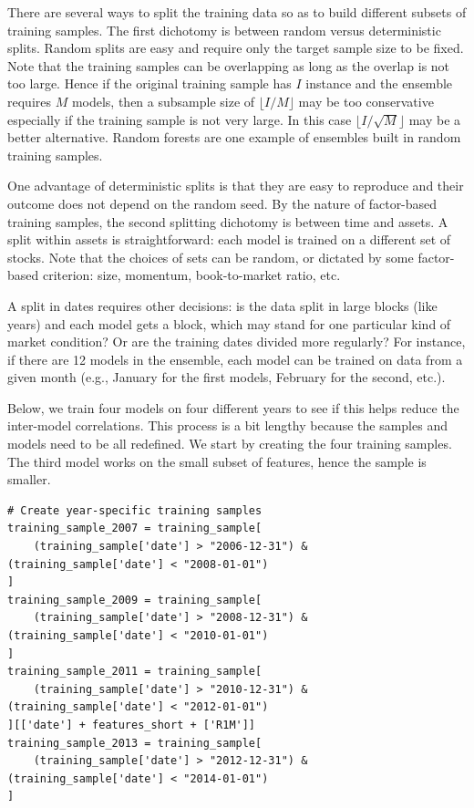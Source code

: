 There are several ways to split the training data so as to build different subsets of training samples. The first dichotomy is between random versus deterministic splits. Random splits are easy and require only the target sample size to be fixed. Note that the training samples can be overlapping as long as the overlap is not too large. Hence if the original training sample has $I$ instance and the ensemble requires $M$ models, then a subsample size of $\lfloor I/M \rfloor$ may be too conservative especially if the training sample is not very large. In this case $\lfloor I/\sqrt{M} \rfloor$ may be a better alternative. Random forests are one example of ensembles built in random training samples.

One advantage of deterministic splits is that they are easy to reproduce and their outcome does not depend on the random seed. By the nature of factor-based training samples, the second splitting dichotomy is between time and assets. A split within assets is straightforward: each model is trained on a different set of stocks. Note that the choices of sets can be random, or dictated by some factor-based criterion: size, momentum, book-to-market ratio, etc.

A split in dates requires other decisions: is the data split in large blocks (like years) and each model gets a block, which may stand for one particular kind of market condition? Or are the training dates divided more regularly? For instance, if there are 12 models in the ensemble, each model can be trained on data from a given month (e.g., January for the first models, February for the second, etc.).

Below, we train four models on four different years to see if this helps reduce the inter-model correlations. This process is a bit lengthy because the samples and models need to be all redefined. We start by creating the four training samples. The third model works on the small subset of features, hence the sample is smaller.

\begin{verbatim}
# Create year-specific training samples
training_sample_2007 = training_sample[
    (training_sample['date'] > "2006-12-31") & (training_sample['date'] < "2008-01-01")
]
training_sample_2009 = training_sample[
    (training_sample['date'] > "2008-12-31") & (training_sample['date'] < "2010-01-01")
]
training_sample_2011 = training_sample[
    (training_sample['date'] > "2010-12-31") & (training_sample['date'] < "2012-01-01")
][['date'] + features_short + ['R1M']]
training_sample_2013 = training_sample[
    (training_sample['date'] > "2012-12-31") & (training_sample['date'] < "2014-01-01")
]
\end{verbatim}

